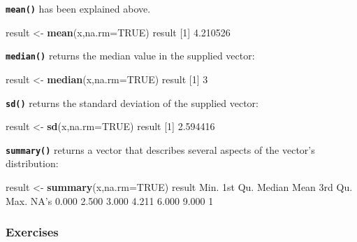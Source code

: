 \documentclass[
]{book}
\newenvironment{Shaded}{\begin{snugshade}}{\end{snugshade}}
\newcommand{\DataTypeTok}[1]{\textcolor[rgb]{0.13,0.29,0.53}{#1}}
\newcommand{\DecValTok}[1]{\textcolor[rgb]{0.00,0.00,0.81}{#1}}
\newcommand{\FloatTok}[1]{\textcolor[rgb]{0.00,0.00,0.81}{#1}}
\newcommand{\KeywordTok}[1]{\textcolor[rgb]{0.13,0.29,0.53}{\textbf{#1}}}
\newcommand{\NormalTok}[1]{#1}
\newcommand{\OtherTok}[1]{\textcolor[rgb]{0.56,0.35,0.01}{#1}}
\newcommand{\StringTok}[1]{\textcolor[rgb]{0.31,0.60,0.02}{#1}}
\begin{document}
\textbf{\texttt{mean()}} has been explained above.

\begin{Shaded}
\begin{Highlighting}[]
\NormalTok{result <-}\StringTok{ }\KeywordTok{mean}\NormalTok{(x,}\DataTypeTok{na.rm=}\OtherTok{TRUE}\NormalTok{)}
\NormalTok{result}
\NormalTok{[}\DecValTok{1}\NormalTok{] }\FloatTok{4.210526}
\end{Highlighting}
\end{Shaded}

\textbf{\texttt{median()}} returns the median value in the supplied vector:

\begin{Shaded}
\begin{Highlighting}[]
\NormalTok{result <-}\StringTok{ }\KeywordTok{median}\NormalTok{(x,}\DataTypeTok{na.rm=}\OtherTok{TRUE}\NormalTok{)}
\NormalTok{result}
\NormalTok{[}\DecValTok{1}\NormalTok{] }\DecValTok{3}
\end{Highlighting}
\end{Shaded}

\textbf{\texttt{sd()}} returns the standard deviation of the supplied vector:

\begin{Shaded}
\begin{Highlighting}[]
\NormalTok{result <-}\StringTok{ }\KeywordTok{sd}\NormalTok{(x,}\DataTypeTok{na.rm=}\OtherTok{TRUE}\NormalTok{)}
\NormalTok{result}
\NormalTok{[}\DecValTok{1}\NormalTok{] }\FloatTok{2.594416}
\end{Highlighting}
\end{Shaded}

\textbf{\texttt{summary()}} returns a vector that describes several aspects of the vector's distribution:

\begin{Shaded}
\begin{Highlighting}[]
\NormalTok{result <-}\StringTok{ }\KeywordTok{summary}\NormalTok{(x,}\DataTypeTok{na.rm=}\OtherTok{TRUE}\NormalTok{)}
\NormalTok{result}
\NormalTok{   Min. 1st Qu.  Median    Mean 3rd Qu.    Max.    NA}\StringTok{'s }
\StringTok{  0.000   2.500   3.000   4.211   6.000   9.000       1 }
\end{Highlighting}
\end{Shaded}

\hypertarget{exercises-4}{%
\subsubsection*{Exercises}\label{exercises-4}}
\end{document}
